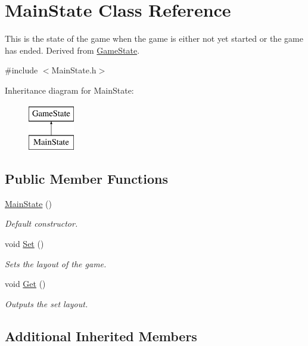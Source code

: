 \hypertarget{classMainState}{\section{Main\-State Class Reference}
\label{classMainState}
}


This is the state of the game when the game is either not yet started or the game has ended. Derived from \hyperlink{classGameState}{Game\-State}.  




{\ttfamily \#include $<$Main\-State.\-h$>$}

Inheritance diagram for Main\-State\-:\begin{figure}[H]
\begin{center}
\leavevmode
\includegraphics[height=2.000000cm]{classMainState}
\end{center}
\end{figure}
\subsection*{Public Member Functions}
\begin{DoxyCompactItemize}
\item 
\hyperlink{classMainState_afc29557ba046813d1bff4aea2501b7f1}{Main\-State} ()
\begin{DoxyCompactList}\small\item\em Default constructor. \end{DoxyCompactList}\item 
void \hyperlink{classMainState_ac01eced9d617c8c8f5382a9aa96adb45}{Set} ()
\begin{DoxyCompactList}\small\item\em Sets the layout of the game. \end{DoxyCompactList}\item 
void \hyperlink{classMainState_a23233e859905d025cfc031a12977a844}{Get} ()
\begin{DoxyCompactList}\small\item\em Outputs the set layout. \end{DoxyCompactList}\end{DoxyCompactItemize}
\subsection*{Additional Inherited Members}


